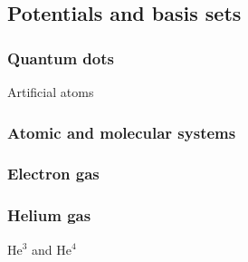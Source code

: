 \subsection{Potentials and basis sets} \label{subsec:potentials}
\subsubsection{Quantum dots} \label{subsubsec:quantumdots}
Artificial atoms
\subsubsection{Atomic and molecular systems} \label{subsubsec:atomic}
\subsubsection{Electron gas} \label{subsubsec:electrongas}
\subsubsection{Helium gas} \label{subsubsec:heliumgas}
He$^3$ and He$^4$

